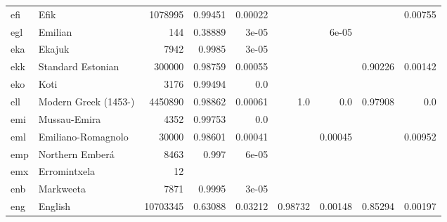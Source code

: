 \documentclass[11pt]{article}
\begin{document}
\begin{table*}[h]
{\begin{tabular}{llrrrrrrr}
efi         & Efik         & 1078995         & 0.99451         & 0.00022         &          &          &          & 0.00755         \\

egl         & Emilian         & 144         & 0.38889         & 3e-05         &          & 6e-05         &          &          \\

eka         & Ekajuk         & 7942         & 0.9985         & 3e-05         &          &          &          &          \\

ekk         & Standard Estonian         & 300000         & 0.98759         & 0.00055         &          &          & 0.90226         & 0.00142         \\

eko         & Koti         & 3176         & 0.99494         & 0.0         &          &          &          &          \\

ell         & Modern Greek (1453-)         & 4450890         & 0.98862         & 0.00061         & 1.0         & 0.0         & 0.97908         & 0.0         \\

emi         & Mussau-Emira         & 4352         & 0.99753         & 0.0         &          &          &          &          \\

eml         & Emiliano-Romagnolo         & 30000         & 0.98601         & 0.00041         &          & 0.00045         &          & 0.00952         \\

emp         & Northern Emberá         & 8463         & 0.997         & 6e-05         &          &          &          &          \\

emx         & Erromintxela         & 12         &          &          &          &          &          &          \\

enb         & Markweeta         & 7871         & 0.9995         & 3e-05         &          &          &          &          \\

eng         & English         & 10703345         & 0.63088         & 0.03212         & 0.98732         & 0.00148         & 0.85294         & 0.00197         \\


\end{tabular}}
\end{table*}
\end{document}
